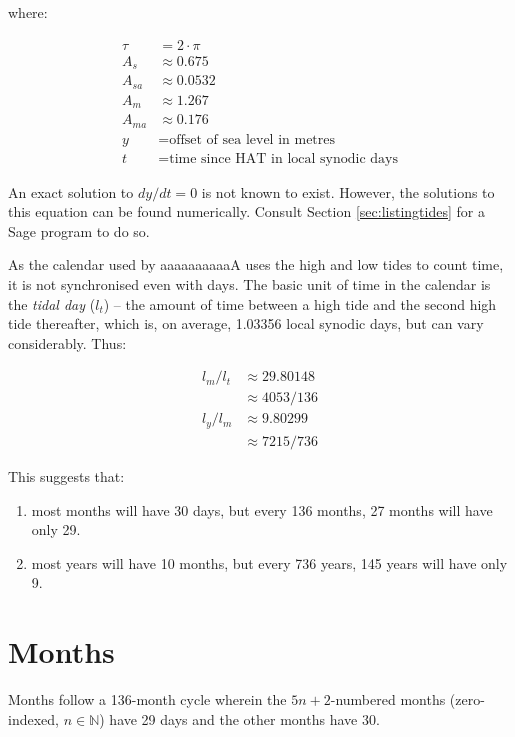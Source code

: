 \documentclass{book}
\newcommand{\lname}{aaaaaaaaaaA}
\begin{document}
where:

\begin{align*}
    \tau &= 2 \cdot \pi \\
    A_s &\approx 0.675 \\
    A_{sa} &\approx 0.0532 \\
    A_m &\approx 1.267 \\
    A_{ma} &\approx 0.176 \\
    y &= \text{offset of sea level in metres} \\
    t &= \text{time since HAT in local synodic days}
\end{align*}

An exact solution to $dy/dt = 0$ is not known to exist. However, the solutions to this equation can be found numerically. Consult Section \ref{sec:listingtides} for a Sage program to do so.

As the calendar used by \lname{} uses the high and low tides to count time, it is not synchronised even with days. The basic unit of time in the calendar is the \emph{tidal day}  ($l_t$) -- the amount of time between a high tide and the second high tide thereafter, which is, on average, 1.03356 local synodic days, but can vary considerably. Thus:

\begin{align}
    l_m / l_t &\approx 29.80148 \\
    &\approx 4053/136 \\
    l_y / l_m &\approx 9.80299 \\
    &\approx 7215/736
\end{align}

This suggests that:

\begin{enumerate}
    \item most months will have 30 days, but every 136 months, 27 months will have only 29.
    \item most years will have 10 months, but every 736 years, 145 years will have only 9.
\end{enumerate}

\newpage

\section{Months}

Months follow a 136-month cycle wherein the $5n + 2$-numbered months (zero-indexed, $n \in \mathbb{N}$) have 29 days and the other months have 30.
\end{document}
